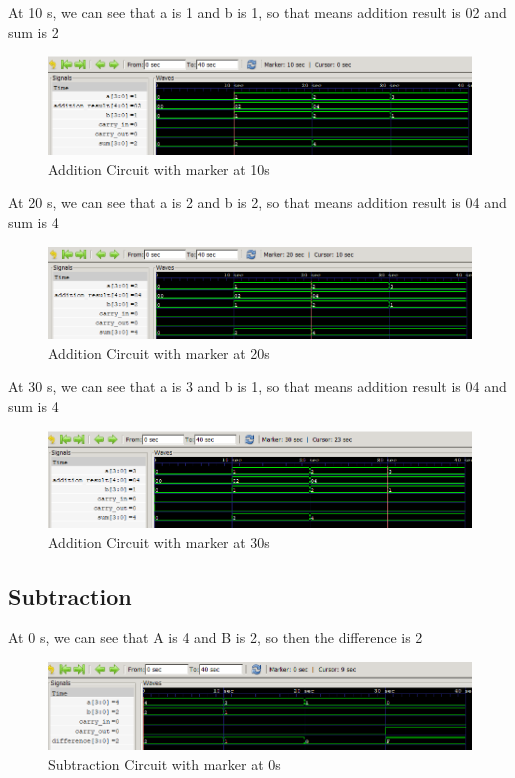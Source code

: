 \documentclass[12pt]{article}
\begin{document}
At 10 s, we can see that a is 1 and b is 1, so that means addition result is 02 and sum is 2
\begin{figure}[h]
    \centering
    \includegraphics[width = 1.0\textwidth]{figs/Add10.png}
    \caption{Addition Circuit with marker at 10s}
    \label{fig:enter-label}
\end{figure}

At 20 s, we can see that a is 2 and b is 2, so that means addition result is 04 and sum is 4 
\begin{figure}[h]
    \centering
    \includegraphics[width = 1.0\textwidth]{figs/Add20.png}
    \caption{Addition Circuit with marker at 20s}
    \label{fig:enter-label}
\end{figure}

\newpage

At 30 s, we can see that a is 3 and b is 1, so that means addition result is 04 and sum is 4
\begin{figure}[h]
    \centering
    \includegraphics[width = 1.0\textwidth]{figs/Add30.png}
    \caption{Addition Circuit with marker at 30s}
    \label{fig:enter-label}
\end{figure}



\subsection{Subtraction}

At 0 s, we can see that A is 4 and B is 2, so then the difference is 2
\begin{figure}[h]
    \centering
    \includegraphics[width = 1.0\textwidth]{figs/Sub0.png}
    \caption{Subtraction Circuit with marker at 0s}
    \label{fig:enter-label}
\end{figure}
\end{document}
